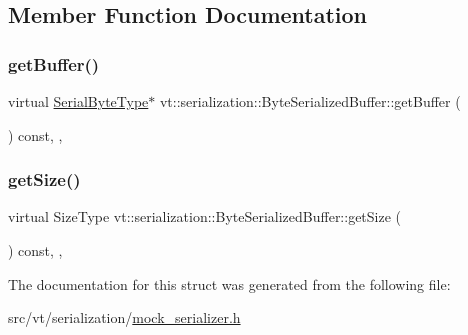 \subsection{Member Function Documentation}
\mbox{\label{structvt_1_1serialization_1_1_byte_serialized_buffer_a3d2538f777f43a80670da3c38fbb4274}} 
\subsubsection{\texorpdfstring{get\+Buffer()}{getBuffer()}}
{\footnotesize\ttfamily virtual \hyperlink{namespacevt_1_1serialization_a74f8d1a55940f9c38fc29522de66d926}{Serial\+Byte\+Type}$\ast$ vt\+::serialization\+::\+Byte\+Serialized\+Buffer\+::get\+Buffer (\begin{DoxyParamCaption}{ }\end{DoxyParamCaption}) const\hspace{0.3cm}{\ttfamily [inline]}, {\ttfamily [override]}, {\ttfamily [virtual]}}

\mbox{\label{structvt_1_1serialization_1_1_byte_serialized_buffer_a433e7f8720272818a6c0eed616c6e5af}} 
\subsubsection{\texorpdfstring{get\+Size()}{getSize()}}
{\footnotesize\ttfamily virtual Size\+Type vt\+::serialization\+::\+Byte\+Serialized\+Buffer\+::get\+Size (\begin{DoxyParamCaption}{ }\end{DoxyParamCaption}) const\hspace{0.3cm}{\ttfamily [inline]}, {\ttfamily [override]}, {\ttfamily [virtual]}}



The documentation for this struct was generated from the following file\+:\begin{DoxyCompactItemize}
\item 
src/vt/serialization/\hyperlink{mock__serializer_8h}{mock\+\_\+serializer.\+h}\end{DoxyCompactItemize}
